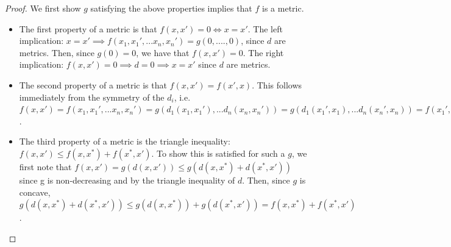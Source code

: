 \begin{proof}
We first show $g$ satisfying the above properties implies that $f$ is a metric.
\begin{itemize}
    \item The first property of a metric is that $f(x,x') = 0 \Longleftrightarrow x = x'$.  The left implication: $x = x' \implies f(x_1, x_1', ... x_n, x_n') = g(0,....,0)$, since $d$ are metrics.  Then, since $g(0) = 0$, we have that $f(x,x') = 0$. The right implication: $f(x,x') = 0 \implies  d = 0 \implies x = x'$ since $d$ are metrics.
    \item The second property of a metric is that $f(x,x') = f(x',x)$. This follows immediately from the symmetry of the $d_i$, i.e. $f(x,x') = f(x_1, x_1', ... x_n, x_n') = g(d_1(x_1, x_1'), ... d_n(x_n, x_n')) = g(d_1(x_1', x_1), ... d_n(x_n', x_n)) =  f(x_1', x_1, ... x_n', x_n) = f(x',x)$.
    \item The third property of a metric is the triangle inequality: $f(x, x') \leq f(x, x^*) +  f(x^*, x') $.  To show this is satisfied for such a $g$, we first note that $f(x,x') = g(d(x,x')) \leq g(d(x, x^*) + d(x^*, x')) $ since g is non-decreasing and by the triangle inequality of $d$. Then, since $g$ is concave, $g(d(x, x^*) + d(x^*, x')) \leq g(d(x, x^*)) + g(d(x^*, x')) = f(x,x^*) + f(x^*, x')$.
    
\end{itemize}


\end{proof}
